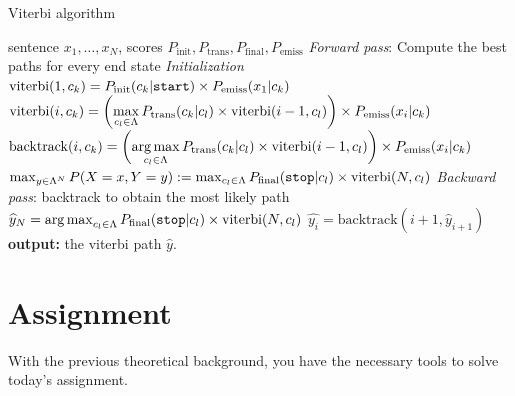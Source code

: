 \begin{algorithm}[t]
   \caption{Viterbi algorithm \label{alg:viterbi}}
\begin{algorithmic}[1]
    sentence $x_1,\ldots,x_N$, scores $P_{\mathrm{init}}, P_{\mathrm{trans}}, P_{\mathrm{final}}, P_{\mathrm{emiss}}$
        \STATE  \emph{Forward pass}: Compute the best paths for every end state
        \STATE \emph{Initialization}
        \STATE $\mathrm{viterbi}(1,c_k) = P_{\mathrm{init}}(c_k|\text{\tt start}) \times 
P_{\mathrm{emiss}}(x_1 | c_k)$
        \ENDFOR 
          \STATE $\mathrm{viterbi}(i, c_k) = \left( \displaystyle \max_{c_l \in \Lambda} P_{\mathrm{trans}}(c_k | c_l) \times \mathrm{viterbi}(i-1, c_l) \right) \times P_{\mathrm{emiss}}(x_i | c_k)$
          \STATE $\mathrm{backtrack}(i, c_k) = \left( \displaystyle \operatorname*{arg\,max}_{c_l \in \Lambda} P_{\mathrm{trans}}(c_k | c_l) \times \mathrm{viterbi}(i-1, c_l) \right) \times P_{\mathrm{emiss}}(x_i | c_k)$
         \ENDFOR 
        \ENDFOR 
       \STATE 
  $\max_{y \in \Lambda^N} P(X=x,Y=y) := \max_{c_l \in \Lambda} P_{\mathrm{final}}(\text{\tt stop} | c_l) \times \mathrm{viterbi}(N, c_l)$        
        \STATE
       \STATE \emph{Backward pass}: backtrack to obtain the most likely path 
	  \STATE $\widehat{y}_N = \operatorname*{arg\,max}_{c_l \in \Lambda} P_{\mathrm{final}}(\text{\tt stop} | c_l) \times \mathrm{viterbi}(N, c_l)$ 
        \STATE $\widehat{y_i} = \mathrm{backtrack}(i+1, \widehat{y}_{i+1})$
        \ENDFOR 
       \STATE \textbf{output:} the viterbi path $\widehat{y}$.
\end{algorithmic}
\end{algorithm}

\section{Assignment}

With the previous theoretical background, you have the necessary tools to solve today's assignment.

